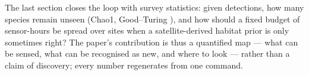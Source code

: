 The last section closes the loop with survey statistics: given detections,
how many species remain unseen (Chao1, Good--Turing \cite{chao1984nonparametric,
good1953population}), and how should a fixed budget of sensor-hours be spread
over sites when a satellite-derived habitat prior is only sometimes right? The
paper's contribution is thus a quantified map --- what can be sensed, what can
be recognised as new, and where to look --- rather than a claim of discovery;
every number regenerates from one command.
